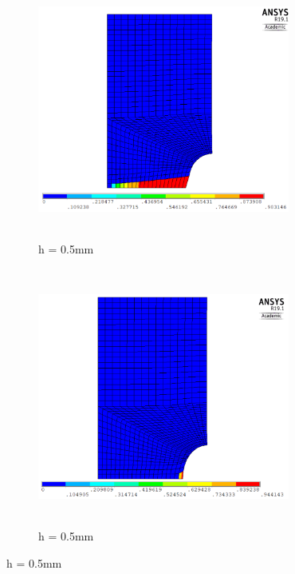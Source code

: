 \documentclass[a4paper,12pt,twoside]{report}
\begin{document}
\FloatBarrier
\begin{figure}[htbp!]\ContinuedFloat 
     \begin{subfigure}{0.4\textwidth}
         \includegraphics[width=8.3cm,height=8.5cm,keepaspectratio]{25.d1-0.5-r.png}
         \caption{h = 0.5mm}
         \label{fig:d1-0.5-r}
     \end{subfigure}   
     \hspace{1.8cm}
     \begin{subfigure}{0.4\textwidth}
         \includegraphics[width=8.3cm,height=8.5cm,keepaspectratio]{25.d1-0.5-nr.png}
         \caption{h = 0.5mm}
         \label{fig:d1-0.5-nr}
     \end{subfigure}
\end{figure}
\FloatBarrier
\end{document}

